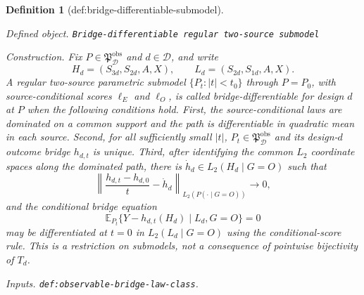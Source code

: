 \documentclass{article}
\newtheorem{definition}{Definition}
\begin{document}
\begin{definition}[def:bridge-differentiable-submodel]\label{def:bridge-differentiable-submodel}
\par\smallskip\noindent\emph{Defined object.} \texttt{Bridge-\allowbreak{}differentiable regular two-\allowbreak{}source submodel}
\par\smallskip\noindent\emph{Construction.} Fix \(P\in\mathfrak P_{\mathcal D}^{\mathrm{obs}}\) and \(d\in\mathcal D\), and write
\[
 H_d=(S_{3d},S_{2d},A,X),\qquad L_d=(S_{2d},S_{1d},A,X).
\]
A regular two-source parametric submodel \(\{P_t:|t|<t_0\}\) through \(P=P_0\), with source-conditional scores \(\ell_E\) and \(\ell_O\), is called \emph{bridge-differentiable for design \(d\) at \(P\)} when the following conditions hold.  First, the source-conditional laws are dominated on a common support and the path is differentiable in quadratic mean in each source.  Second, for all sufficiently small \(|t|\), \(P_t\in\mathfrak P_{\mathcal D}^{\mathrm{obs}}\) and its design-\(d\) outcome bridge \(h_{d,t}\) is unique.  Third, after identifying the common \(L_2\) coordinate spaces along the dominated path, there is \(\dot h_d\in L_2(H_d\mid G=O)\) such that
\[
 \left\|\frac{h_{d,t}-h_{d,0}}{t}-\dot h_d\right\|_{L_2(P(\cdot\mid G=O))}\longrightarrow0,
\]
and the conditional bridge equation
\[
 \mathbb E_{P_t}\{Y-h_{d,t}(H_d)\mid L_d,G=O\}=0
\]
may be differentiated at \(t=0\) in \(L_2(L_d\mid G=O)\) using the conditional-score rule.  This is a restriction on submodels, not a consequence of pointwise bijectivity of \(T_d\).
\par\smallskip\noindent\emph{Inputs.} \texttt{def:\allowbreak{}observable-\allowbreak{}bridge-\allowbreak{}law-\allowbreak{}class}.
\end{definition}
\end{document}
